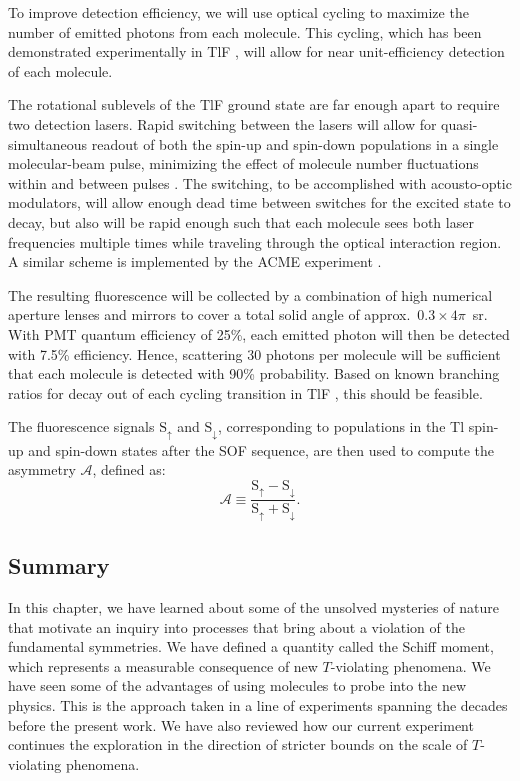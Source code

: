 To improve detection efficiency, we will use optical cycling to maximize the
number of emitted photons from each molecule. This cycling, which has been
demonstrated experimentally in TlF
\cite{clayburn2019optical,clayburn2021improved,clayburn2022improved}, will allow
for near unit-efficiency detection of each molecule.

The rotational sublevels of the TlF ground state are far enough apart to require
two detection lasers. Rapid switching between the lasers will allow for
quasi-simultaneous readout of both the spin-up and spin-down populations in a
single molecular-beam pulse, minimizing the effect of molecule number
fluctuations within and between pulses \cite{kirilov2013shot}. The switching, to
be accomplished with acousto-optic modulators, will allow enough dead time
between switches for the excited state to decay, but also will be rapid enough
such that each molecule sees both laser frequencies multiple times while
traveling through the optical interaction region. A similar scheme is
implemented by the ACME experiment \cite{acme2018improved}.

The resulting fluorescence will be collected by a combination of high numerical
aperture lenses and mirrors to cover a total solid angle of approx.\
$0.3\times4\pi$~sr. With PMT quantum efficiency of 25\%, each emitted photon
will then be detected with 7.5\% efficiency. Hence, scattering 30 photons per
molecule will be sufficient that each molecule is detected with 90\%
probability. Based on known branching ratios for decay out of each cycling
transition in TlF \cite{norrgard2017hyperfine}, this should be feasible.

The fluorescence signals $\mathrm{S}_\uparrow$ and $\mathrm{S}_\downarrow$,
corresponding to populations in the Tl spin-up and spin-down states after the
\gls{SOF} sequence, are then used to compute the asymmetry $\mathcal{A}$,
defined as:
%
\begin{equation}
    \mathcal{A}\equiv\frac{\mathrm{S}_\uparrow-\mathrm{S}_\downarrow}{\mathrm{S}_\uparrow+\mathrm{S}_\downarrow}.
\end{equation}

\subsection{Summary}


In this chapter, we have learned about some of the unsolved mysteries of nature
that motivate an inquiry into processes that bring about a violation of the
fundamental symmetries. We have defined a quantity called the Schiff moment,
which represents a measurable consequence of new $T$-violating phenomena. We
have seen some of the advantages of using molecules to probe into the new
physics. This is the approach taken in a line of experiments spanning the
decades before the present work. We have also reviewed how our current
experiment continues the exploration in the direction of stricter bounds on the
scale of $T$-violating phenomena.

